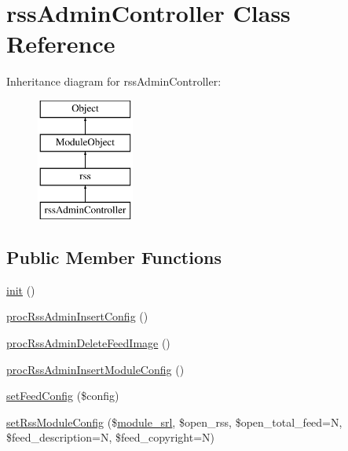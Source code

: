 \hypertarget{classrssAdminController}{}\section{rss\+Admin\+Controller Class Reference}
\label{classrssAdminController}
Inheritance diagram for rss\+Admin\+Controller\+:\begin{figure}[H]
\begin{center}
\leavevmode
\includegraphics[height=4.000000cm]{classrssAdminController}
\end{center}
\end{figure}
\subsection*{Public Member Functions}
\begin{DoxyCompactItemize}
\item 
\hyperlink{classrssAdminController_ad73e127c3d6191b7d82e2fd3f50ef477}{init} ()
\item 
\hyperlink{classrssAdminController_abacdc1717d07ac5cfe2d4bb83f08d310}{proc\+Rss\+Admin\+Insert\+Config} ()
\item 
\hyperlink{classrssAdminController_a37eed33f761ae0a1cdcce49562bed601}{proc\+Rss\+Admin\+Delete\+Feed\+Image} ()
\item 
\hyperlink{classrssAdminController_ae07c8748cdccb2d13dfb4140e9c13aeb}{proc\+Rss\+Admin\+Insert\+Module\+Config} ()
\item 
\hyperlink{classrssAdminController_a57c67e2413e7d6491f090975531094cd}{set\+Feed\+Config} (\$config)
\item 
\hyperlink{classrssAdminController_ac4be2f74cc3b47f20d96b45c7ec5b619}{set\+Rss\+Module\+Config} (\$\hyperlink{ko_8install_8php_a370bb6450fab1da3e0ed9f484a38b761}{module\+\_\+srl}, \$open\+\_\+rss, \$open\+\_\+total\+\_\+feed=\textquotesingle{}N\textquotesingle{}, \$feed\+\_\+description=\textquotesingle{}N\textquotesingle{}, \$feed\+\_\+copyright=\textquotesingle{}N\textquotesingle{})
\end{DoxyCompactItemize}
